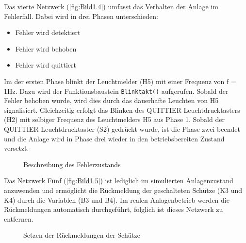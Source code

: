 Das vierte Netzwerk (\autoref{fig:Bild1.4}) umfasst das Verhalten der Anlage im Fehlerfall. Dabei wird in drei Phasen unterschieden:
\begin{itemize}
    \item Fehler wird detektiert
    \item Fehler wird behoben
    \item Fehler wird quittiert
\end{itemize}

Im der ersten Phase blinkt der Leuchtmelder (H5) mit einer Frequenz von f = 1Hz. Dazu wird der Funktionsbaustein \texttt{Blinktakt()} aufgerufen. Sobald der Fehler behoben wurde, wird dies durch das dauerhafte Leuchten von H5 signalisiert. Gleichzeitig erfolgt das Blinken des QUITTIER-Leuchtdrucktasters (H2) mit selbiger Frequenz des Leuchtmelders H5 aus Phase 1. Sobald der QUITTIER-Leuchtdrucktaster (S2) gedrückt wurde, ist die Phase zwei beendet und die Anlage wird in Phase drei wieder in den betriebsbereiten Zustand versetzt.

\begin{figure}[H]
   \centering
   \caption[Beschreibung des Fehlerzustands]{Beschreibung des Fehlerzustands}
   \label{fig:Bild1.4}
\end{figure}

Das Netzwerk Fünf (\autoref{fig:Bild1.5}) ist lediglich im simulierten Anlagenzustand anzuwenden und ermöglicht die Rückmeldung der geschalteten Schütze (K3 und K4) durch die Variablen (B3 und B4). Im realen Anlagenbetrieb werden die Rückmeldungen automatisch durchgeführt, folglich ist dieses Netzwerk zu entfernen.

\begin{figure}[H]
   \centering
   \caption[Setzen der Rückmeldungen der Schütze]{Setzen der Rückmeldungen der Schütze}
   \label{fig:Bild1.5}
\end{figure}

